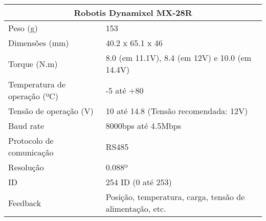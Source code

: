 \begin{table}[]
	\begin{tabular}{ll}
		
		\multicolumn{2}{c}{Robotis Dynamixel MX-28R}                                            \\ \hline
		Peso (g)                     & 153                                                      \\ \hline
		Dimensões (mm)               & 40.2 x 65.1 x 46                                         \\ \hline
		Torque (N.m)                 & 8.0 (em 11.1V), 8.4 (em 12V) e 10.0 (em 14.4V)           \\ \hline
		Temperatura de operação (ºC) & -5 até +80                                               \\ \hline
		Tensão de operação (V)       & 10 até 14.8 (Tensão recomendada: 12V)                    \\ \hline
		Baud rate                    & 8000bps até 4.5Mbps                                      \\ \hline
		Protocolo de comunicação     & RS485                                                    \\ \hline
		Resolução                    & 0.088º                                                   \\ \hline
		ID                           & 254 ID (0 até 253)                                       \\ \hline
		Feedback                     & Posição, temperatura, carga, tensão de alimentação, etc. \\ \hline
	\end{tabular}
\end{table}

 

